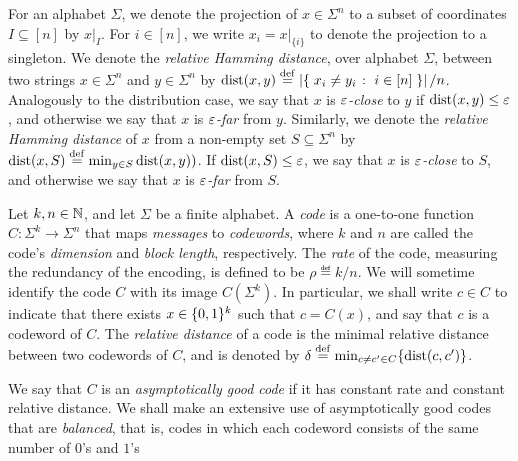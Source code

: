 For an alphabet $\Sigma$, we denote the projection of $x \in \Sigma^n$ to a subset of coordinates $I \subseteq [n]$ by $x|_I$. For $i \in [n]$, we write $x_i = x|_{\{i\}}$ to denote the projection to a singleton. We denote the \emph{relative Hamming distance}, over alphabet $\Sigma$, between two strings $x \in \Sigma^n$ and $y \in \Sigma^n$ by $\dist{x}{y} \eqdef \abs{ \setOfSuchThat{ x_i \neq y_i }{ i \in [n] } }/n$.  Analogously to the distribution case, we say that $x$ is \emph{$\varepsilon$-close} to $y$ if $\dist{x}{y} \leq \eps$, and otherwise we say that $x$ is \emph{$\varepsilon$-far} from $y$. Similarly, we denote the \emph{relative Hamming distance} of $x$ from a non-empty set $S \subseteq \Sigma^n$ by $\dist{x}{S} \eqdef \min_{y \in S} \dist{x}{y})$. If $\dist{x}{S} \leq \eps$, we say that $x$ is \emph{$\varepsilon$-close} to $S$, and otherwise we say that $x$ is \emph{$\varepsilon$-far} from $S$.

Let $k,n\in\mathbb{N}$, and let $\Sigma$ be a finite alphabet. A \emph{code} is a one-to-one function $C\colon\Sigma^k \to \Sigma^n$ that maps \emph{messages} to \emph{codewords}, where $k$ and $n$ are called the code's \emph{dimension} and \emph{block length}, respectively. The \emph{rate} of the code, measuring the redundancy of the encoding, is defined to be $\rho \eqdef k/n$. We will sometime identify the code $C$ with its image $C(\Sigma^k)$. In particular, we shall write $c \in C$ to indicate that there exists $x\in\{0,1\}^k$ such that $c = C(x)$, and say that $c$ is a codeword of $C$.  The \emph{relative distance} of a code is the minimal relative distance between two codewords of $C$, and is denoted by $\delta \eqdef \min_{c \neq c' \in C}\{\dist{c}{c'}\}$. 

We say that $C$ is an \emph{asymptotically good code} if it has constant rate and constant relative distance. We shall make an extensive use of asymptotically good codes that are \emph{balanced}, that is, codes in which each codeword consists of the same number of $0$'s and $1$'s

